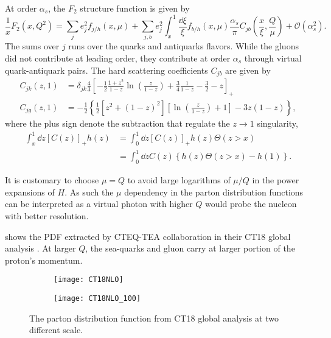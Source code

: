 \documentclass[../main.tex]{subfiles}
\begin{document}
At order $\alpha_s$, the $F_2$ structure function is given by \cite{collins1989}
\begin{equation}
	\frac{1}{x} F_2\left(x,Q^2\right) = \sum_j e^2_j f_{j/h}\left(x,\mu\right) + \sum_{j,b} e^2_j \int^1_x \frac{\dd{\xi}}{\xi} f_{b/h}\left(x,\mu\right) \frac{\alpha_s}{\pi} C_{jb}\left(\frac{x}{\xi}, \frac{Q}{\mu}\right) + \mathcal{O}(\alpha_s^2).
\end{equation}
The sums over $j$ runs over the quarks and antiquarks flavors. While the gluons
did not contribute at leading order, they contribute at order $\alpha_s$ through
virtual quark-antiquark pairs. The hard scattering coefficients $C_{jb}$ are
given by
\begin{align}
	C_{jk}(z,1) &= \delta_{jk} \frac{4}{3} \left[ -\frac{1}{2}\frac{1+z^2}{1-z} \ln\left(\frac{z}{1-z}\right) + \frac{3}{4} \frac{1}{1-z} -\frac{3}{2} -z\right]_+\\
	C_{jg}(z,1) &= -\frac{1}{2} \left\{ \frac{1}{2}\left[z^2+(1-z)^2\right] \left[\ln\left(\frac{z}{1-z}\right)+1\right] -3z(1-z)\right\},
\end{align}
where the plus sign denote the subtraction that regulate the $z\rightarrow1$ 
singularity,
\begin{equation}
	\begin{split}
		\int^1_x \dd{z} \left[C(z)\right]_+ h(z) &= \int_0^1 \dd{z} \left[C(z)\right]_+ h(z)\Theta(z>x)\\
		& = \int_0^1 \dd{z} C(z) \left\{h(z)\Theta(z>x) -h(1)\right\}.
	\end{split}
\end{equation}

It is customary to choose $\mu =Q$ to avoid large logarithms of $\mu /Q$ in the
power expansions of $H$. As such the $\mu$ dependency in the parton distribution
functions can be interpreted as a virtual photon with higher $Q$ would probe the
nucleon with better resolution.

 shows the PDF extracted by CTEQ-TEA collaboration in their
CT18 global analysis \cite{hou2019}. At larger $Q$, the sea-quarks and gluon 
carry at larger portion of the proton's momentum. 

\begin{figure}
	\centering
	\begin{subfigure}{0.45\linewidth}
		\texttt{[image: CT18NLO]}
	\end{subfigure}
	\begin{subfigure}{0.45\linewidth}
		\texttt{[image: CT18NLO\_100]}
	\end{subfigure}
	\caption{The parton distribution function from CT18 \cite{hou2019} global analysis at two different scale.}
	\label{fig:CT18_scale}
\end{figure}
\end{document}
